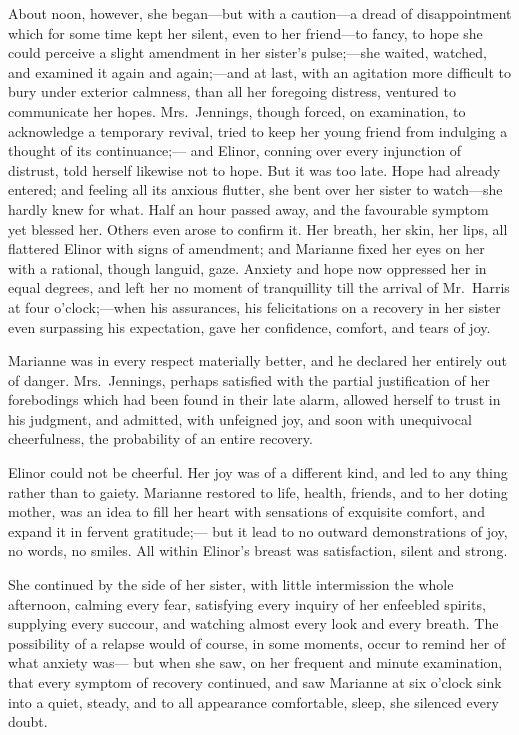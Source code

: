 About noon, however, she began---but with a caution---a
dread of disappointment which for some time kept her silent,
even to her friend---to fancy, to hope she could perceive
a slight amendment in her sister's pulse;---she waited,
watched, and examined it again and again;---and at last,
with an agitation more difficult to bury under exterior calmness,
than all her foregoing distress, ventured to communicate
her hopes.  Mrs.\ Jennings, though forced, on examination,
to acknowledge a temporary revival, tried to keep her
young friend from indulging a thought of its continuance;---%
and Elinor, conning over every injunction of distrust,
told herself likewise not to hope.  But it was too late.
Hope had already entered; and feeling all its anxious flutter,
she bent over her sister to watch---she hardly knew for what.
Half an hour passed away, and the favourable symptom
yet blessed her.  Others even arose to confirm it.
Her breath, her skin, her lips, all flattered Elinor
with signs of amendment; and Marianne fixed her eyes on
her with a rational, though languid, gaze.  Anxiety and
hope now oppressed her in equal degrees, and left her no
moment of tranquillity till the arrival of Mr.\ Harris at
four o'clock;---when his assurances, his felicitations on
a recovery in her sister even surpassing his expectation,
gave her confidence, comfort, and tears of joy.

Marianne was in every respect materially better,
and he declared her entirely out of danger.  Mrs.\ Jennings,
perhaps satisfied with the partial justification of her
forebodings which had been found in their late alarm,
allowed herself to trust in his judgment, and admitted,
with unfeigned joy, and soon with unequivocal cheerfulness,
the probability of an entire recovery.

Elinor could not be cheerful.  Her joy was of a
different kind, and led to any thing rather than to gaiety.
Marianne restored to life, health, friends, and to her
doting mother, was an idea to fill her heart with sensations
of exquisite comfort, and expand it in fervent gratitude;---%
but it lead to no outward demonstrations of joy, no words,
no smiles.  All within Elinor's breast was satisfaction,
silent and strong.

She continued by the side of her sister, with little
intermission the whole afternoon, calming every fear,
satisfying every inquiry of her enfeebled spirits,
supplying every succour, and watching almost every look and
every breath.  The possibility of a relapse would of course,
in some moments, occur to remind her of what anxiety was---%
but when she saw, on her frequent and minute examination,
that every symptom of recovery continued, and saw Marianne
at six o'clock sink into a quiet, steady, and to all
appearance comfortable, sleep, she silenced every doubt.


